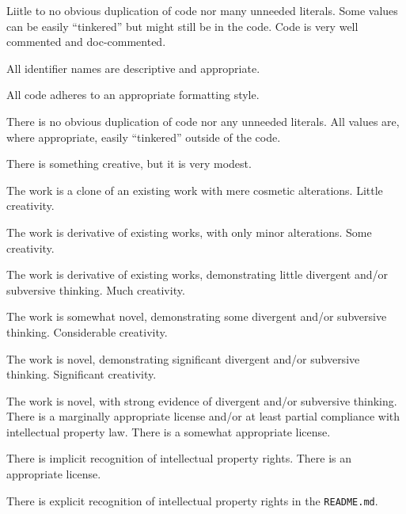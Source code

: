 \documentclass{../../fal_assignment}
\begin{document}
\begin{markingrubric}
             \par Liitle to no obvious duplication of code nor many unneeded literals. Some values can be easily ``tinkered'' but might still be in the code. 
        \grade Code is very well commented and doc-commented.
            \par All identifier names are descriptive and appropriate.
            \par All code adheres to an appropriate formatting style.
             \par There is no obvious duplication of code nor any unneeded literals. All values are, where appropriate, easily ``tinkered'' outside of the code.  
%
\end{markingrubric}

\begin{markingrubric}
%
        \grade\fail There is something creative, but it is very modest.
            \par The work is a clone of an existing work with mere cosmetic alterations.
        \grade Little creativity.
            \par The work is derivative of existing works, with only minor alterations.
        \grade Some creativity.
            \par The work is derivative of existing works, demonstrating little divergent and/or subversive thinking.
        \grade Much creativity.
            \par The work is somewhat novel, demonstrating some divergent and/or subversive thinking.
        \grade Considerable creativity.
            \par The work is novel, demonstrating significant divergent and/or subversive thinking.
        \grade Significant creativity.
            \par The work is novel, with strong evidence of divergent and/or subversive thinking.
%
        \grade\fail There is a marginally appropriate license and/or at least partial compliance with intellectual property law.
        \grade There is a somewhat appropriate license.
            \par There is implicit recognition of intellectual property rights.
        \grade There is an appropriate license. 
            \par There is explicit recognition of intellectual property rights in the \texttt{README.md}.

\end{markingrubric}
\end{document}
